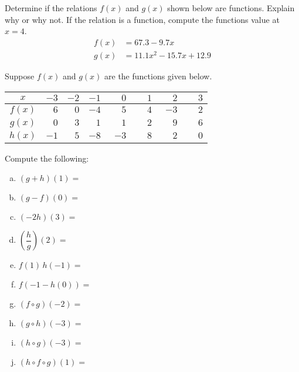 \documentclass[11pt,letterpaper]{article}
\begin{document}
\newpage



 Determine if the relations $f(x)$ and $g(x)$ shown below are functions. Explain why or why not. If the relation is a function, compute the functions value at $x= 4$. 
	\[
	\begin{aligned}
	f(x)&= 67.3 - 9.7x \\[0.3cm]
	g(x)&= 11.1x^2 - 15.7x + 12.9
	\end{aligned}
	\]



\newpage



 Suppose $f(x)$ and $g(x)$ are the functions given below. 
        \begin{table}[!ht]
        \centering
        \begin{tabular}{| c || r | r | r | r | r | r | r |} \hline
	$x$ & $-3$ & $-2$ & $-1$ & $\phantom{-}0$ & $\phantom{-}1$ & $\phantom{-}2$ & $\phantom{-}3$ \\ \hline \hline
	$f(x)$ & $6$ & $0$ & $-4$ & $5$ & $4$ & $-3$ & $2$ \\ \hline
	$g(x)$ & $0$ & $3$ & $1$ & $1$ & $2$ & $9$ & $6$ \\ \hline
	$h(x)$ & $-1$ & $5$ & $-8$ & $-3$ & $8$ & $2$ & $0$ \\ \hline
        \end{tabular}
        \end{table}

Compute the following: \pspace
        \begin{enumerate}[(a)]
        \item $(g + h)(1)=$ \vfill
        \item $(g - f)(0)=$ \vfill
        \item $(-2h)(3)=$ \vfill
        \item $\left(\dfrac{h}{g}\right)(2)=$ \vfill
        \item $f(1)\, h(-1)=$ \vfill
        \item $f(-1 - h(0))=$ \vfill
        \item $(f \circ g)(-2)=$ \vfill
	\item $(g \circ h)(-3)=$ \vfill
        \item $(h \circ g)(-3)=$ \vfill
	\item $(h \circ f \circ g)(1)=$ \vfill
        \end{enumerate} 
\end{document}
